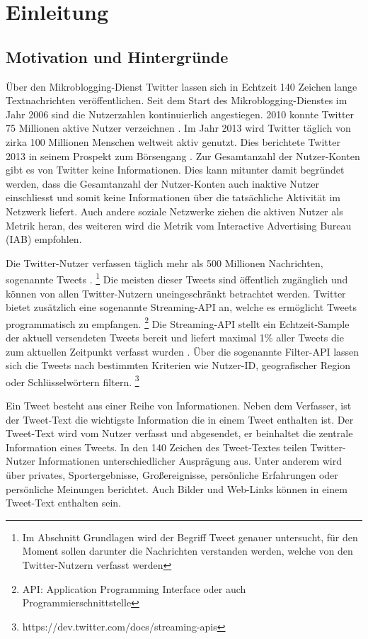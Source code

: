 \chapter{Einleitung}\label{chp:Einleitung}

	\section{Motivation und Hintergründe}

		Über den Mikroblogging-Dienst Twitter lassen sich in Echtzeit 140 Zeichen lange Textnachrichten veröffentlichen.
		Seit dem Start des Mikroblogging-Dienstes im Jahr 2006 sind die Nutzerzahlen kontinuierlich angestiegen.
		2010 konnte Twitter 75 Millionen aktive Nutzer verzeichnen \cite{Cheng2010}.
		Im Jahr 2013 wird Twitter täglich von zirka 100 Millionen Menschen weltweit aktiv genutzt.
		Dies berichtete Twitter 2013 in seinem Prospekt zum Börsengang \cite{twitterinc2013}.  
		Zur Gesamtanzahl der Nutzer-Konten gibt es von Twitter keine Informationen. 
		Dies kann mitunter damit begründet werden, dass die Gesamtanzahl der Nutzer-Konten auch inaktive Nutzer einschliesst und somit keine Informationen über die tatsächliche Aktivität im Netzwerk liefert. 
		Auch andere soziale Netzwerke ziehen die aktiven Nutzer als Metrik heran, des weiteren wird die Metrik vom Interactive Advertising Bureau (IAB) empfohlen. \cite{IAB}
		
		Die Twitter-Nutzer verfassen täglich mehr als 500 Millionen Nachrichten, sogenannte Tweets \cite{twitterinc2013}. \footnote{Im Abschnitt Grundlagen wird der Begriff Tweet genauer untersucht, für den Moment sollen darunter die Nachrichten verstanden werden, welche von den Twitter-Nutzern verfasst werden}
		Die meisten dieser Tweets sind öffentlich zugänglich und können von allen Twitter-Nutzern uneingeschränkt betrachtet werden. 
		Twitter bietet zusätzlich eine sogenannte Streaming-API an, welche es ermöglicht Tweets programmatisch zu empfangen. \footnote{API: Application Programming Interface oder auch Programmierschnittstelle}
		Die Streaming-API stellt ein Echtzeit-Sample der aktuell versendeten Tweets bereit und liefert maximal 1\% aller Tweets die zum aktuellen Zeitpunkt verfasst wurden \cite{Morstatter2013}. 
		Über die sogenannte Filter-API lassen sich die Tweets nach bestimmten Kriterien wie Nutzer-ID, geografischer Region oder Schlüsselwörtern filtern.
		 \footnote{https://dev.twitter.com/docs/streaming-apis} 

		Ein Tweet besteht aus einer Reihe von Informationen.
		Neben dem Verfasser, ist der Tweet-Text die wichtigste Information die in einem Tweet enthalten ist.  
		Der Tweet-Text wird vom Nutzer verfasst und abgesendet, er beinhaltet die zentrale Information eines Tweets. 
		In den 140 Zeichen des Tweet-Textes teilen Twitter-Nutzer Informationen unterschiedlicher Ausprägung aus.
		Unter anderem wird über privates, Sportergebnisse, Großereignisse, persönliche Erfahrungen oder persönliche Meinungen berichtet. 
		Auch Bilder und Web-Links können in einem Tweet-Text enthalten sein. 

